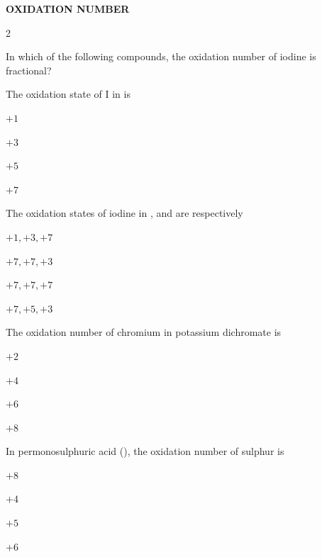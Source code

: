\documentclass[10pt,a4paper]{article}
\begin{document}
\begin{mdframed}[backgroundcolor=sectionbg, linewidth=0pt, innerleftmargin=6pt, innerrightmargin=6pt, innertopmargin=4pt, innerbottommargin=4pt]
\color{white}\bfseries\small\centering OXIDATION NUMBER
\end{mdframed}

\begin{multicols}{2}
\begin{questions}[start=56]

\item In which of the following compounds, the oxidation number of iodine is fractional?
\begin{options}
  \item {}
  \item {}
  \item {}
  \item {}
\end{options}

\item The oxidation state of I in  is
\begin{options}
  \item $+1$
  \item $+3$
  \item $+5$
  \item $+7$
\end{options}

\item The oxidation states of iodine in ,  and  are respectively
\begin{options}
  \item $+1, +3, +7$
  \item $+7, +7, +3$
  \item $+7, +7, +7$
  \item $+7, +5, +3$
\end{options}

\item The oxidation number of chromium in potassium dichromate is
\begin{options}
  \item $+2$
  \item $+4$
  \item $+6$
  \item $+8$
\end{options}

\item In permonosulphuric acid (), the oxidation number of sulphur is
\begin{options}
  \item $+8$
  \item $+4$
  \item $+5$
  \item $+6$
\end{options}


\end{questions}
\end{multicols}
\end{document}
